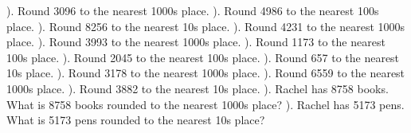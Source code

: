 \documentclass{article}%
\begin{document}
). Round 3096 to the nearest 1000s place.%
\newline%
\newline%
). Round 4986 to the nearest 100s place.%
\newline%
\newline%
). Round 8256 to the nearest 10s place.%
\newline%
\newline%
). Round 4231 to the nearest 1000s place.%
\newline%
\newline%
). Round 3993 to the nearest 1000s place.%
\newline%
\newline%
). Round 1173 to the nearest 100s place.%
\newline%
\newline%
). Round 2045 to the nearest 100s place.%
\newline%
\newline%
). Round 657 to the nearest 10s place.%
\newline%
\newline%
). Round 3178 to the nearest 1000s place.%
\newline%
\newline%
). Round 6559 to the nearest 1000s place.%
\newline%
\newline%
). Round 3882 to the nearest 10s place.%
\newline%
\newline%
). Rachel has 8758 books. What is 8758 books rounded to the nearest 1000s place?%
\newline%
\newline%
). Rachel has 5173 pens. What is 5173 pens rounded to the nearest 10s place?%
\newline%
\newline%
\newline%
\end{document}
